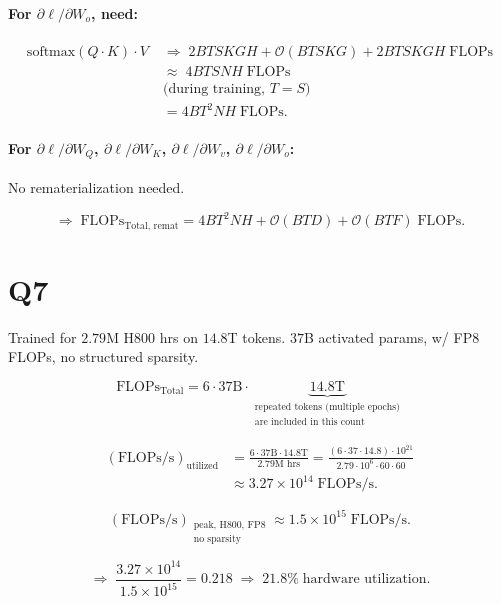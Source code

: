 \documentclass[11pt]{article}
\newcommand{\flops}{\text{FLOPs}}
\newcommand{\flopss}{\text{FLOPs/s}}
\begin{document}
\paragraph{For $\partial \ell / \partial W_o$, need:}
\begin{align*}
\text{softmax}(Q \cdot K) \cdot V \;&\Rightarrow\; 2BTSKGH + \mathcal{O}(BTSKG) + 2BTSKGH \;\flops \\
&\approx\; 4BTSNH \;\flops \\
&\text{(during training, $T = S$)} \\
&= 4BT^2 NH \;\flops.
\end{align*}

\paragraph{For $\partial \ell / \partial W_Q$, $\partial \ell / \partial W_K$, $\partial \ell / \partial W_v$, $\partial \ell / \partial W_o$:}
No rematerialization needed.

\[
\Rightarrow\; \flops_{\text{Total, remat}} = 4BT^2 NH + \mathcal{O}(BTD) + \mathcal{O}(BTF) \;\flops.
\]

\section*{Q7}

Trained for $2.79$M H800 hrs on $14.8$T tokens. $37$B activated params, w/ FP8 FLOPs, no structured sparsity.

\[
\flops_{\text{Total}} = 6 \cdot 37\text{B} \cdot \underbrace{14.8\text{T}}_{\substack{\text{repeated tokens (multiple epochs)} \\ \text{are included in this count}}}
\]

\begin{align*}
\left(\flopss\right)_{\text{utilized}}
&= \frac{6 \cdot 37\text{B} \cdot 14.8\text{T}}{2.79\text{M hrs}}
= \frac{(6 \cdot 37 \cdot 14.8) \cdot 10^{21}}{2.79 \cdot 10^6 \cdot 60 \cdot 60} \\
&\approx 3.27 \times 10^{14} \;\flopss.
\end{align*}

\[
\left(\flopss\right)_{\substack{\text{peak, H800, FP8} \\ \text{no sparsity}}} \approx 1.5 \times 10^{15} \;\flopss.
\]

\[
\Rightarrow\; \frac{3.27 \times 10^{14}}{1.5 \times 10^{15}} = 0.218 \;\Rightarrow\; 21.8\% \;\text{hardware utilization.}
\]
\end{document}
